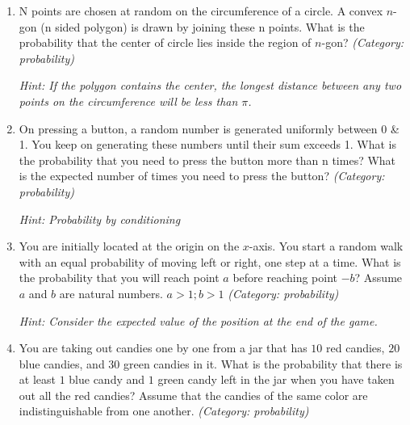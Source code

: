 \begin{enumerate}
\item N points are chosen at random on the circumference of a circle. A convex $n$-gon (n sided polygon) is drawn by joining these n points. What is the probability that the center of circle lies inside the region of $n$-gon?
\small\emph{(Category: probability)}

\small\emph{Hint: If the polygon contains the center, the longest distance between any two points on the circumference will be less than $\pi$.}





\item On pressing a button, a random number is generated uniformly between 0 \& 1. You keep on generating these numbers until their sum exceeds 1. What is the probability that you need to press the button more than n times? What is the expected number of times you need to press the button?
\small\emph{(Category: probability)}

\small\emph{Hint: Probability by conditioning}





\item You are initially located at the origin on the $x$-axis. You start a random walk with an equal probability of moving left or right, one step at a time. What is the probability that you will reach point $a$ before reaching point $-b$?
Assume $a$ and $b$ are natural numbers. $a >1; b > 1$
\small\emph{(Category: probability)}

\small\emph{Hint: Consider the expected value of the position at the end of the game.}





\item You are taking out candies one by one from a jar that has $10$ red candies, $20$ blue candies, and $30$ green candies in it. What is the probability that there is at least $1$ blue candy and $1$ green candy left in the jar when you have taken out all the red candies?
Assume that the candies of the same color are indistinguishable from one another.
\small\emph{(Category: probability)}


\end{enumerate}

